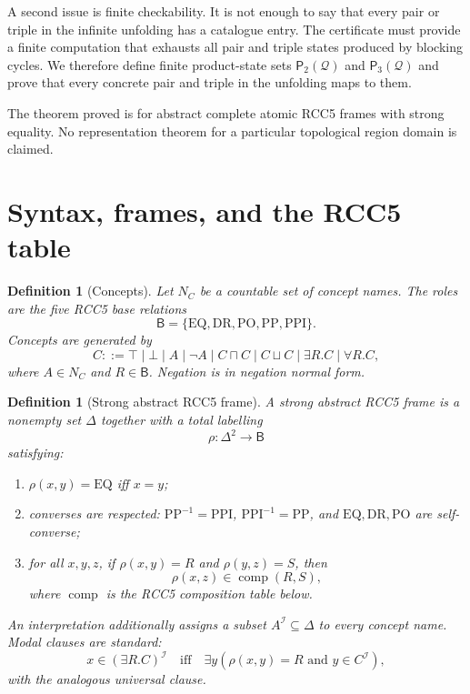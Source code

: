 \documentclass[11pt]{article}
\newtheorem{definition}[theorem]{Definition}
\newcommand{\comp}{\operatorname{comp}}
\newcommand{\PP}{\mathrm{PP}}
\newcommand{\PPI}{\mathrm{PPI}}
\newcommand{\DR}{\mathrm{DR}}
\newcommand{\PO}{\mathrm{PO}}
\newcommand{\EQ}{\mathrm{EQ}}
\newcommand{\B}{\mathsf B}
\newcommand{\I}{\mathcal I}
\newcommand{\Q}{\mathcal Q}
\newcommand{\Pairs}{\mathsf{P}_2}
\newcommand{\Triples}{\mathsf{P}_3}
\begin{document}
A second issue is finite checkability.  It is not enough to say that every pair or triple in the infinite unfolding has a catalogue entry.  The certificate must provide a finite computation that exhausts all pair and triple states produced by blocking cycles.  We therefore define finite product-state sets $\Pairs(\Q)$ and $\Triples(\Q)$ and prove that every concrete pair and triple in the unfolding maps to them.

The theorem proved is for abstract complete atomic RCC5 frames with strong equality.  No representation theorem for a particular topological region domain is claimed.

\section{Syntax, frames, and the RCC5 table}

\begin{definition}[Concepts]
Let $N_C$ be a countable set of concept names.  The roles are the five RCC5 base relations
\[
  \B=\{\EQ,\DR,\PO,\PP,\PPI\}.
\]
Concepts are generated by
\[
 C ::= \top\mid \bot\mid A\mid \neg A\mid C\sqcap C\mid C\sqcup C
      \mid \exists R.C\mid \forall R.C,
\]
where $A\in N_C$ and $R\in\B$.  Negation is in negation normal form.
\end{definition}

\begin{definition}[Strong abstract RCC5 frame]
A strong abstract RCC5 frame is a nonempty set $\Delta$ together with a total labelling
\[
  \rho:\Delta^2\to\B
\]
satisfying:
\begin{enumerate}[label=(F\arabic*)]
\item $\rho(x,y)=\EQ$ iff $x=y$;
\item converses are respected: $\PP^{-1}=\PPI$, $\PPI^{-1}=\PP$, and $\EQ,\DR,\PO$ are self-converse;
\item for all $x,y,z$, if $\rho(x,y)=R$ and $\rho(y,z)=S$, then
\[
   \rho(x,z)\in\comp(R,S),
\]
where $\comp$ is the RCC5 composition table below.
\end{enumerate}
An interpretation additionally assigns a subset $A^\I\subseteq\Delta$ to every concept name.  Modal clauses are standard:
\[
 x\in(\exists R.C)^\I \quad\text{iff}\quad
 \exists y(\rho(x,y)=R\text{ and }y\in C^\I),
\]
with the analogous universal clause.
\end{definition}
\end{document}
